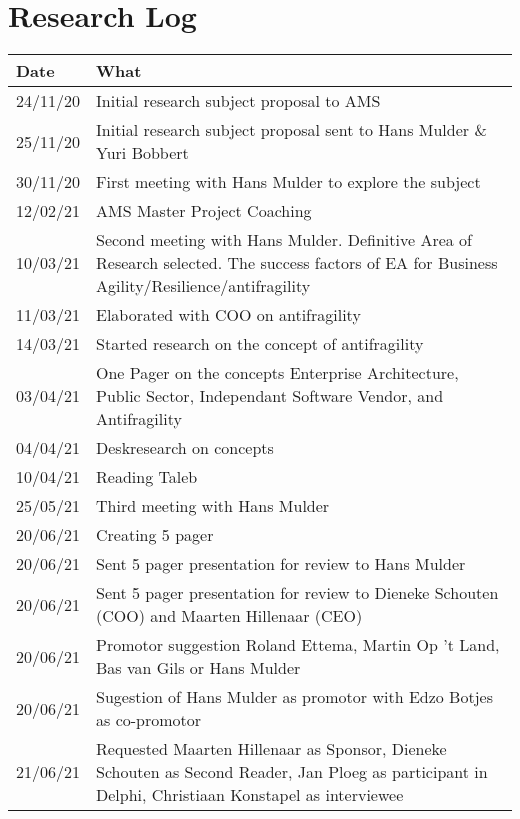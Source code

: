 \chapter{Research Log}
\label{app:researchlog}

\begin{table}[!h]
	\begin{center}
		\begin{tabularx}{\textwidth}{@{}lX@{}}
			\toprule
			\textbf{Date} & \textbf{What} \\ \midrule%
			24/11/20 & Initial research subject proposal to AMS \\%
			25/11/20 & Initial research subject proposal sent to Hans Mulder \& Yuri Bobbert \\%
			30/11/20 & First meeting with Hans Mulder to explore the subject \\%
			12/02/21 & AMS Master Project Coaching \\%
			10/03/21 & Second meeting with Hans Mulder. Definitive Area of Research selected. The success factors of EA for Business Agility/Resilience/antifragility \\%
			11/03/21 & Elaborated with COO on antifragility \\%
			14/03/21 & Started research on the concept of antifragility \\%
			03/04/21 & One Pager on the concepts Enterprise Architecture, Public Sector, Independant Software Vendor, and Antifragility \\%
			04/04/21 & Deskresearch on concepts \\%
			10/04/21 & Reading Taleb \\%
			25/05/21 & Third meeting with Hans Mulder \\%
			20/06/21 & Creating 5 pager \\%
			20/06/21 & Sent 5 pager presentation for review to Hans Mulder \\%
			20/06/21 & Sent 5 pager presentation for review to Dieneke Schouten (COO) and Maarten Hillenaar (CEO) \\%
			20/06/21 & Promotor suggestion Roland Ettema, Martin Op 't Land, Bas van Gils or Hans Mulder \\%
			20/06/21 & Sugestion of Hans Mulder as promotor with Edzo Botjes as co-promotor \\%
			21/06/21 & Requested Maarten Hillenaar as Sponsor, Dieneke Schouten as Second Reader, Jan Ploeg as participant in Delphi, Christiaan Konstapel as interviewee \\%

\end{tabularx}
\end{center}
\end{table}
